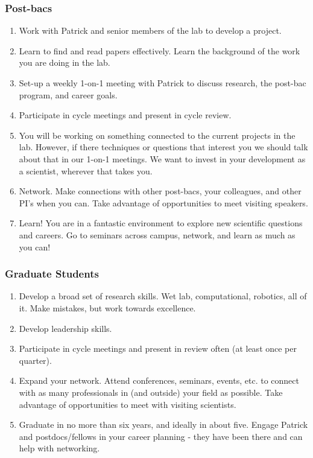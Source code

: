 \documentclass[10pt, letterpaper, twocolumn]{article} %
\begin{document}
\subsubsection{Post-bacs}
\begin{enumerate}
\item Work with Patrick and senior members of the lab to develop a project.
\item Learn to find and read papers effectively. Learn the background of the work you are doing in the lab.
\item Set-up a weekly 1-on-1 meeting with Patrick to discuss research, the post-bac program, and career goals.
\item Participate in cycle meetings and present in cycle review.
\item You will be working on something connected to the current projects in the lab. However, if there techniques or questions that interest you we should talk about that in our 1-on-1 meetings. We want to invest in your development as a scientist, wherever that takes you.
\item Network. Make connections with other post-bacs, your colleagues, and other PI's when you can. Take advantage of opportunities to meet visiting speakers.
\item Learn! You are in a fantastic environment to explore new scientific questions and careers. Go to seminars across campus, network, and learn as much as you can!
\end{enumerate}
\subsubsection{Graduate Students}
\begin{enumerate}
\item Develop a broad set of research skills. Wet lab, computational, robotics, all of it. Make mistakes, but work towards excellence.
\item Develop leadership skills.
\item Participate in cycle meetings and present in review often (at least once per quarter).
\item Expand your network. Attend conferences, seminars, events, etc. to connect with as many professionals in (and outside) your field as possible. Take advantage of opportunities to meet with visiting scientists.
\item Graduate in no more than six years, and ideally in about five. Engage Patrick and postdocs/fellows in your career planning - they have been there and can help with networking.
\end{enumerate}
\end{document}
